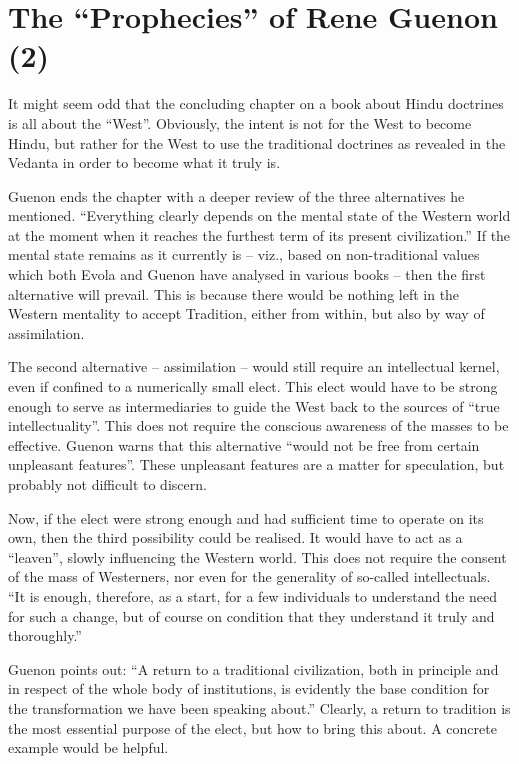 \section{The “Prophecies” of Rene Guenon (2)}

It might seem odd that the concluding chapter on a book about Hindu doctrines is all about the ``West''. Obviously, the intent is not for the West to become Hindu, but rather for the West to use the traditional doctrines as revealed in the Vedanta in order to become what it truly is.

Guenon ends the chapter with a deeper review of the three alternatives he mentioned. ``Everything clearly depends on the mental state of the Western world at the moment when it reaches the furthest term of its present civilization.'' If the mental state remains as it currently is -- viz., based on non-traditional values which both Evola and Guenon have analysed in various books -- then the first alternative will prevail. This is because there would be nothing left in the Western mentality to accept Tradition, either from within, but also by way of assimilation.

The second alternative -- assimilation -- would still require an intellectual kernel, even if confined to a numerically small elect. This elect would have to be strong enough to serve as intermediaries to guide the West back to the sources of ``true intellectuality''. This does not require the conscious awareness of the masses to be effective. Guenon warns that this alternative ``would not be free from certain unpleasant features''. These unpleasant features are a matter for speculation, but probably not difficult to discern.

Now, if the elect were strong enough and had sufficient time to operate on its own, then the third possibility could be realised. It would have to act as a ``leaven'', slowly influencing the Western world. This does not require the consent of the mass of Westerners, nor even for the generality of so-called intellectuals. ``It is enough, therefore, as a start, for a few individuals to understand the need for such a change, but of course on condition that they understand it truly and thoroughly.''

Guenon points out: ``A return to a traditional civilization, both in principle and in respect of the whole body of institutions, is evidently the base condition for the transformation we have been speaking about.'' Clearly, a return to tradition is the most essential purpose of the elect, but how to bring this about. A concrete example would be helpful.

